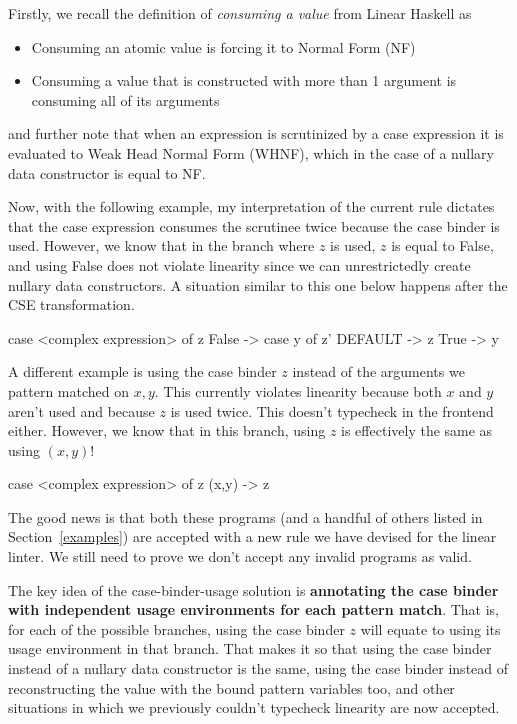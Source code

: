 \documentclass[]{lwnovathesis}
\begin{document}
Firstly, we recall the definition of \emph{consuming a value} from Linear
Haskell as
\begin{itemize}
    \item Consuming an atomic value is forcing it to Normal Form (NF)
    \item Consuming a value that is constructed with more than 1 argument is
        consuming all of its arguments
\end{itemize}
and further note that when an expression is scrutinized by a case expression it
is evaluated to Weak Head Normal Form (WHNF), which in the case of a nullary data
constructor is equal to NF.

Now, with the following example, my interpretation of the current rule dictates
that the case expression consumes the scrutinee twice because the case binder is
used. However, we know that in the branch where $z$ is used, $z$ is equal to
False, and using False does not violate linearity since we can unrestrictedly
create nullary data constructors. A situation similar to this one below happens
after the CSE transformation.
\begin{code}
    case <complex expression> of z {
        False -> case y of z' { DEFAULT -> z }
        True  -> y
    }
\end{code}

A different example is using the case binder $z$ instead of the arguments we
pattern matched on $x,y$. This currently violates linearity because both $x$ and
$y$ aren't used and because $z$ is used twice. This doesn't typecheck in the
frontend either. However, we know that in this branch, using $z$ is effectively
the same as using $(x,y)$!
\begin{code}
    case <complex expression> of z {
        (x,y) -> z
    }
\end{code}

The good news is that both these programs (and a handful of others listed in
Section~\ref{examples}) are accepted with a new rule we have devised for the
linear linter. We still need to prove we don't accept any invalid programs as
valid.

The key idea of the case-binder-usage solution is \textbf{annotating the case binder
with independent usage environments for each pattern match}. That is, for
each of the possible branches, using the case binder $z$ will equate to
using its usage environment in that branch. That makes it so that using the
case binder instead of a nullary data constructor is the same, using the case
binder instead of reconstructing the value with the bound pattern variables too,
and other situations in which we previously couldn't typecheck linearity are
now accepted.
\end{document}
